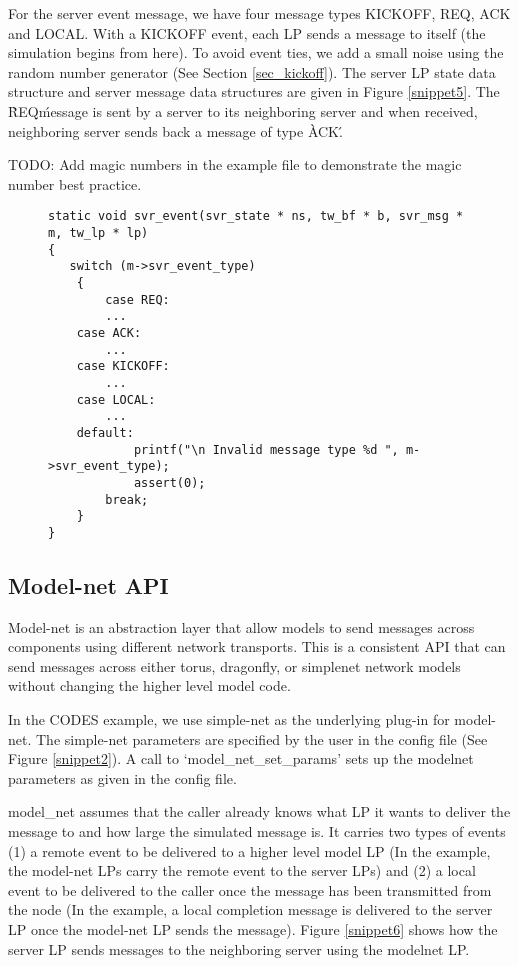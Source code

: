 \documentclass[conference,10pt,compsocconf,onecolumn]{IEEEtran}
\begin{document}
For the server event message, we have four message types KICKOFF, REQ, ACK and
LOCAL.  With a KICKOFF event, each LP sends a message to itself (the simulation
begins from here).  To avoid event ties, we add a small noise using the random
number generator (See Section \ref{sec_kickoff}). The server LP state data structure
and server message data structures are given in Figure \ref{snippet5}. The \`REQ\'
message is sent by a server to its neighboring server and when received,
neighboring server sends back a message of type \`ACK\'.

TODO: Add magic numbers in the example file to demonstrate the magic number best
practice. 

\begin{figure}
\begin{lstlisting}[caption=Event handler of the server LP type., label=snippet5]
static void svr_event(svr_state * ns, tw_bf * b, svr_msg * m, tw_lp * lp)
{
   switch (m->svr_event_type)
    {
        case REQ:
        ...
	case ACK:
        ...
	case KICKOFF:
        ...
	case LOCAL:
        ...
	default:
            printf("\n Invalid message type %d ", m->svr_event_type);
            assert(0);
        break;
    }
}
\end{lstlisting}
\end{figure}

\subsection{Model-net API}
Model-net is an abstraction layer that allow models to send messages
across components using different network transports.  This is a
consistent API that can send messages across either torus, dragonfly, or
simplenet network models without changing the higher level model code.

In the CODES example, we use simple-net as the underlying plug-in for
model-net. The simple-net parameters are specified by the user in the config
file (See Figure \ref{snippet2}). A call to `model\_net\_set\_params' sets up
the model\-net parameters as given in the config file.

model\_net assumes that the caller already knows what LP it wants to deliver the
message to and how large the simulated message is. It carries two types of
events (1) a remote event to be delivered to a higher level model LP (In the
example, the model-net LPs carry the remote event to the server LPs) and (2) a
local event to be delivered to the caller once the message has been transmitted
from the node (In the example, a local completion message is delivered to the
server LP once the model-net LP sends the message). Figure \ref{snippet6} shows
how the server LP sends messages to the neighboring server using the model\-net
LP. 
\end{document}
